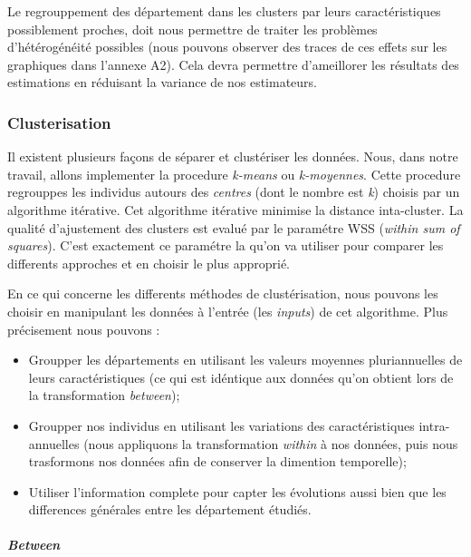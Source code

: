 \documentclass[11pt,]{article}
\providecommand{\tightlist}{%
  \setlength{\itemsep}{0pt}\setlength{\parskip}{0pt}}
\let\oldparagraph\paragraph
\renewcommand{\paragraph}[1]{\oldparagraph{#1}\mbox{}}
\begin{document}
Le regrouppement des département dans les clusters par leurs
caractéristiques possiblement proches, doit nous permettre de traiter
les problèmes d'hétérogénéité possibles (nous pouvons observer des
traces de ces effets sur les graphiques dans l'annexe A2). Cela devra
permettre d'ameillorer les résultats des estimations en réduisant la
variance de nos estimateurs.

\hypertarget{clusterisation}{%
\subsubsection{Clusterisation}\label{clusterisation}}

Il existent plusieurs façons de séparer et clustériser les données.
Nous, dans notre travail, allons implementer la procedure \emph{k-means}
ou \emph{k-moyennes}. Cette procedure regrouppes les individus autours
des \emph{centres} (dont le nombre est \emph{k}) choisis par un
algorithme itérative. Cet algorithme itérative minimise la distance
inta-cluster. La qualité d'ajustement des clusters est evalué par le
paramétre WSS (\emph{within sum of squares}). C'est exactement ce
paramétre la qu'on va utiliser pour comparer les differents approches et
en choisir le plus approprié.

En ce qui concerne les differents méthodes de clustérisation, nous
pouvons les choisir en manipulant les données à l'entrée (les
\emph{inputs}) de cet algorithme. Plus précisement nous pouvons :

\begin{itemize}
\tightlist
\item
  Groupper les départements en utilisant les valeurs moyennes
  pluriannuelles de leurs caractéristiques (ce qui est idéntique aux
  données qu'on obtient lors de la transformation \emph{between});
\item
  Groupper nos individus en utilisant les variations des
  caractéristiques intra-annuelles (nous appliquons la transformation
  \emph{within} à nos données, puis nous trasformons nos données afin de
  conserver la dimention temporelle);
\item
  Utiliser l'information complete pour capter les évolutions aussi bien
  que les differences générales entre les département étudiés.
\end{itemize}

\hypertarget{between}{%
\paragraph{\texorpdfstring{\emph{Between}}{Between}}\label{between}}
\end{document}
